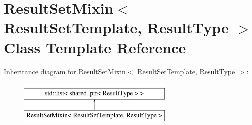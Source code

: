 \hypertarget{class_result_set_mixin}{\section{Result\-Set\-Mixin$<$ Result\-Set\-Template, Result\-Type $>$ Class Template Reference}
\label{class_result_set_mixin}
}
Inheritance diagram for Result\-Set\-Mixin$<$ Result\-Set\-Template, Result\-Type $>$\-:\begin{figure}[H]
\begin{center}
\leavevmode
\includegraphics[height=2.000000cm]{class_result_set_mixin}
\end{center}
\end{figure}
